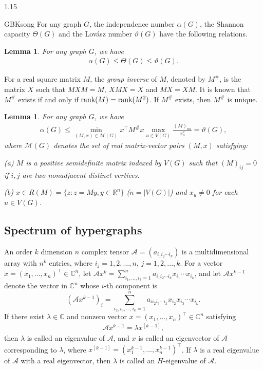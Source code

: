 \documentclass[preprint,12pt]{elsarticle}
\newtheorem{lem}[thm]{Lemma}
\begin{document}
\begin{spacing}{1.15}
\begin{CJK*}{GBK}{song}
For any graph $G$, the independence number $\alpha(G)$, the Shannon capacity $\Theta(G)$ and the Lov\'{a}sz number $\vartheta(G)$ have the following relations.
\begin{lem}\label{Shannon}
\textup{\cite{L}} For any graph $G$, we have
\begin{eqnarray*}
\alpha (G) \leqslant \Theta \left( G \right) \leqslant \vartheta (G).
\end{eqnarray*}
\end{lem}

For a real square matrix $M$, the \textit{group inverse} of $M$, denoted by $M^\#$, is the matrix $X$ such that $MXM=M,~XMX=X$ and $MX=XM$. It is known \cite{Ben-Israel} that $M^\#$ exists if and only if $\mbox{\rm rank}(M)=\mbox{\rm rank}(M^2)$. If $M^\#$ exists, then $M^\#$ is unique.
\begin{lem} \label{zhou1}
\textup{\cite{zhou}} For any graph $G$, we have
\begin{eqnarray*}
\alpha(G)\leq\min_{(M,x)\in\mathcal{M}(G)}x^\top M^\#x\max_{u\in V(G)}\frac{(M)_{uu}}{x_u^2}=\vartheta(G),
\end{eqnarray*}
where $\mathcal{M}(G)$ denotes the set of real matrix-vector pairs $(M,x)$ satisfying:

\noindent (a) $M$ is a positive semidefinite matrix indexed by $V(G)$ such that $(M)_{ij}=0$ if $i,j$ are two nonadjacent distinct vertices.

\noindent \noindent (b) $x\in R(M)=\{z:z=My,y\in\mathbb{R}^n\}$ {\rm (}$n=|V(G)|${\rm )} and $x_u\neq0$ for each $u\in V(G)$.
\end{lem}

\subsection{Spectrum of hypergraphs}
An order $k$ dimension $n$ complex tensor $\mathcal{A}=(a_{i_1i_2\cdots i_k})$ is a multidimensional array with $n^k$ entries, where $i_{j}=1,2,...,n$, $j=1,2,...,k$. For a vector $x=(x_1,\ldots,x_n)^\top\in\mathbb{C}^{n}$, let $\mathcal{A}x^k=\sum_{i_1,\ldots,i_k=1}^na_{i_1i_2\cdots i_k}x_{i_1}\cdots x_{i_k}$, and let $\mathcal{A}x^{k-1}$ denote the vector in $\mathbb{C}^{n}$ whose $i$-th component is
\[{\left( {\mathcal{A}{x^{k - 1}}} \right)_i} = \sum\limits_{{i_2},{i_3}, \cdots ,{i_k} = 1}^n {{a_{i{i_2}{i_3} \cdots {i_k}}}} {x_{{i_2}}}{x_{{i_3}}} \cdots {x_{{i_k}}}.\]
If there exist $\lambda\in\mathbb{C}$ and nonzero vector $x=(x_1,\ldots,x_n)^\top\in\mathbb{C}^{n}$ satisfying
\begin{align*}
\mathcal{A}x^{k-1}=\lambda x^{[k-1]},
\end{align*}
then $\lambda$ is called an eigenvalue \cite{Lim,Qi} of $\mathcal{A}$, and $x$ is called an eigenvector of $\mathcal{A}$ corresponding to $\lambda$, where $x^{[k-1]}=(x_{1}^{k-1},\ldots,x_{n}^{k-1})^\top$. If $\lambda$ is a real eigenvalue of $\mathcal{A}$ with a real eigenvector, then $\lambda$ is called an $H$-eigenvalue \cite{Qi} of $\mathcal{A}$.


\end{CJK*}
\end{spacing}
\end{document}
